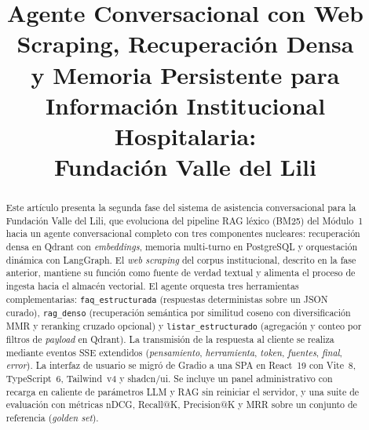 \documentclass[conference]{IEEEtran}
\newcommand{\code}[1]{\texttt{\small #1}}
\begin{document}
\title{Agente Conversacional con Web Scraping, Recuperación Densa\\
y Memoria Persistente para Información Institucional Hospitalaria:\\
Fundación Valle del Lili}

\author{
}

\maketitle

\begin{abstract}
Este artículo presenta la segunda fase del sistema de asistencia conversacional
para la Fundación Valle del Lili, que evoluciona del pipeline RAG léxico (BM25)
del Módulo~1 hacia un agente conversacional completo con tres componentes
nucleares: recuperación densa en Qdrant con \textit{embeddings}, memoria
multi-turno en PostgreSQL y orquestación dinámica con LangGraph. El
\textit{web scraping} del corpus institucional, descrito en la fase anterior,
mantiene su función como fuente de verdad textual y alimenta el proceso de
ingesta hacia el almacén vectorial. El agente orquesta tres herramientas
complementarias: \code{faq\_estructurada} (respuestas deterministas sobre un
JSON curado), \code{rag\_denso} (recuperación semántica por similitud coseno
con diversificación MMR y reranking cruzado opcional) y
\code{listar\_estructurado} (agregación y conteo por filtros de \textit{payload}
en Qdrant). La transmisión de la respuesta al cliente se realiza mediante
eventos SSE extendidos (\textit{pensamiento}, \textit{herramienta},
\textit{token}, \textit{fuentes}, \textit{final}, \textit{error}).
La interfaz de usuario se migró de Gradio a una SPA en React~19 con
Vite~8, TypeScript~6, Tailwind~v4 y shadcn/ui. Se incluye un panel
administrativo con recarga en caliente de parámetros LLM y RAG sin
reiniciar el servidor, y una suite de evaluación con métricas nDCG,
Recall@K, Precision@K y MRR sobre un conjunto de referencia (\textit{golden set}).
\end{abstract}
\end{document}
